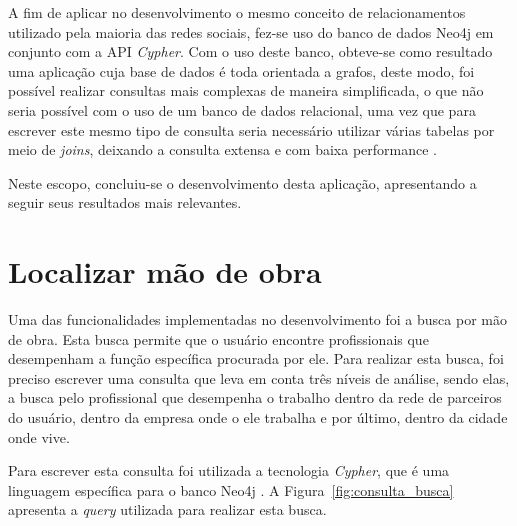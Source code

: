 \par A fim de aplicar no desenvolvimento o mesmo conceito de relacionamentos utilizado pela maioria das redes sociais, fez-se uso do banco de dados Neo4j em conjunto com a API \textit{Cypher}. Com o uso deste banco, obteve-se como resultado uma aplicação cuja base de dados é toda orientada a grafos, deste modo, foi possível realizar consultas mais complexas de maneira simplificada, o que não seria possível com o uso de um banco de dados relacional, uma vez que para escrever este mesmo tipo de consulta seria necessário utilizar várias tabelas por meio de \textit{joins}, deixando a consulta extensa e com baixa performance \cite{sadalage_fowler_nosql_distilled_brief_guide}.

\par Neste escopo, concluiu-se o desenvolvimento desta aplicação, apresentando a seguir seus resultados mais relevantes.


\section{Localizar mão de obra}

\par Uma das funcionalidades implementadas no desenvolvimento foi a busca por mão de obra. Esta busca permite que o usuário encontre profissionais que desempenham a função específica procurada por ele. Para realizar esta busca, foi preciso escrever uma consulta que leva em conta três níveis de análise, sendo elas, a busca pelo profissional que desempenha o trabalho dentro da rede de parceiros do usuário, dentro da empresa onde o ele trabalha e por último, dentro da cidade onde vive.  

\par Para escrever esta consulta foi utilizada a tecnologia \textit{Cypher}, que é uma linguagem específica para o banco Neo4j \cite{neo4j_team_manual}. A Figura~\ref{fig:consulta_busca} apresenta a \textit{query} utilizada para realizar esta busca.

